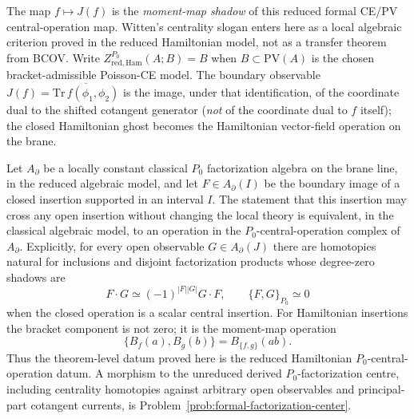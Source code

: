 \documentclass[11pt]{memoir}
\begin{document}
The map $f\mapsto J(f)$ is the \emph{moment-map shadow} of this reduced
formal CE/PV central-operation map. Witten's centrality slogan enters
here as a local algebraic criterion proved in the reduced Hamiltonian
model, not as a transfer theorem from BCOV.  Write
\(Z^{P_0}_{\mathrm{red,Ham}}(A;B)=B\) when \(B\subset\mathrm{PV}(A)\)
is the chosen bracket-admissible Poisson-CE model.  The boundary
observable $J(f)=\overline{\mathrm{Tr}\,f(\phi_1,\phi_2)}$ is the image,
under that identification, of the coordinate dual to the shifted
cotangent generator (\emph{not} of the coordinate dual to $f$ itself);
the closed Hamiltonian ghost becomes the Hamiltonian vector-field
operation on the brane.

\begin{thm}
  \label{thm:witten-centrality-local-form}
  Let \(A_\partial\) be a locally constant classical \(P_0\)
  factorization algebra on the brane line, in the reduced algebraic
  model, and let \(F\in A_\partial(I)\) be the boundary image of a
  closed insertion supported in an interval \(I\). The statement that this
  insertion may cross any open insertion without changing the local theory
  is equivalent, in the classical algebraic model, to an operation in the
  \(P_0\)-central-operation complex of \(A_\partial\). Explicitly, for
  every open observable \(G\in A_\partial(J)\) there are homotopies
  natural for inclusions and disjoint factorization products whose
  degree-zero shadows are
  \[
    F\cdot G\simeq (-1)^{|F||G|}G\cdot F,\qquad
    \{F,G\}_{P_0}\simeq 0
  \]
  when the closed operation is a scalar central insertion. For Hamiltonian
  insertions the bracket component is not zero; it is the moment-map
  operation
  \[
    \{B_f(a),B_g(b)\}=B_{\{f,g\}}(ab).
  \]
  Thus the theorem-level datum proved here is the reduced Hamiltonian
  \(P_0\)-central-operation datum. A morphism to the unreduced derived
  \(P_0\)-factorization centre, including centrality homotopies against
  arbitrary open observables and principal-part cotangent currents, is
  Problem~\ref{prob:formal-factorization-center}.
\end{thm}
\end{document}
